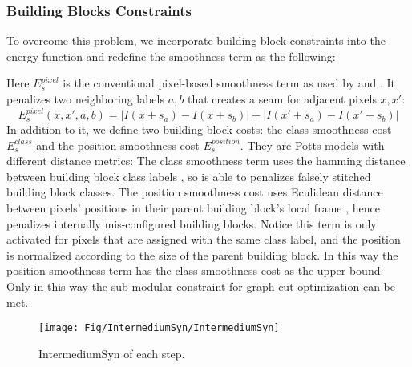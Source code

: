 \documentclass{acmtog}
\begin{document}
\subsubsection{Building Blocks Constraints}

To overcome this problem, we incorporate building block constraints into the energy function and redefine the smoothness term as the following:


Here $E_{s}^{pixel}$ is the conventional pixel-based smoothness term as used by \cite{Pritch09ICCV} and \cite{He2012PO}. It penalizes two neighboring labels $a, b$ that creates a seam for adjacent pixels $x, x'$:
%
\begin{equation}
E_{s}^{pixel}(x, x', a, b) = |I(x + s_{a}) - I(x + s_{b})| + |I(x' + s_{a}) - I(x' + s_{b})|
\label{eq:ESmooth}
\end{equation}
%
In addition to it, we define two building block costs: the class smoothness cost $E_{s}^{class}$ and the position smoothness cost $E_{s}^{position}$. They are Potts models with different distance metrics: The class smoothness term uses the hamming distance between building block class labels , so is able to penalizes falsely stitched building block classes. The position smoothness cost uses Eculidean distance between pixels' positions in their parent building block's local frame , hence penalizes internally mis-configured building blocks. Notice this term is only activated for pixels that are assigned with the same class label, and the position is normalized according to the size of the parent building block. In this way the position smoothness term has the class smoothness cost as the upper bound. Only in this way the sub-modular constraint for graph cut optimization \cite{BOYKOVpami2001} can be met.

\begin{figure}[t!]
  \centering
  \texttt{[image: Fig/IntermediumSyn/IntermediumSyn]}
  \caption{IntermediumSyn of each step.} \label{fig:IntermediumSyn}
\end{figure}
\end{document}
